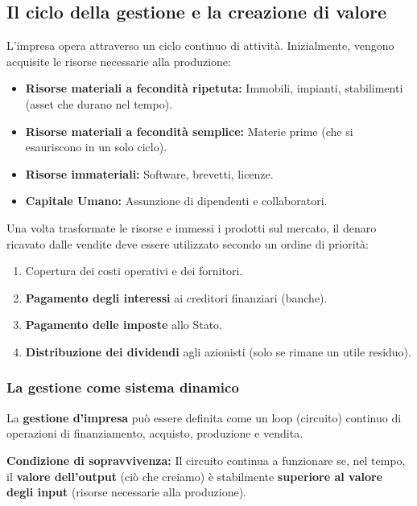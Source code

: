 \documentclass[a4paper,12pt]{article}
\begin{document}
	\subsection{Il ciclo della gestione e la creazione di valore}
	L'impresa opera attraverso un ciclo continuo di attività. Inizialmente, vengono acquisite le risorse necessarie alla produzione:
	\begin{itemize}
		\item \textbf{Risorse materiali a fecondità ripetuta:} Immobili, impianti, stabilimenti (asset che durano nel tempo).
		\item \textbf{Risorse materiali a fecondità semplice:} Materie prime (che si esauriscono in un solo ciclo).
		\item \textbf{Risorse immateriali:} Software, brevetti, licenze.
		\item \textbf{Capitale Umano:} Assunzione di dipendenti e collaboratori.
	\end{itemize}
	
	Una volta trasformate le risorse e immessi i prodotti sul mercato, il denaro ricavato dalle vendite deve essere utilizzato secondo un ordine di priorità:
	\begin{enumerate}
		\item Copertura dei costi operativi e dei fornitori.
		\item \textbf{Pagamento degli interessi} ai creditori finanziari (banche).
		\item \textbf{Pagamento delle imposte} allo Stato.
		\item \textbf{Distribuzione dei dividendi} agli azionisti (solo se rimane un utile residuo).
	\end{enumerate}
	
	\subsubsection{La gestione come sistema dinamico}
	La \textbf{gestione d'impresa} può essere definita come un loop (circuito) continuo di operazioni di finanziamento, acquisto, produzione e vendita. 
	
	\begin{tcolorbox}[colback=green!5,colframe=green!60!black]
		\textbf{Condizione di sopravvivenza:} Il circuito continua a funzionare se, nel tempo, il \textbf{valore dell'output} (ciò che creiamo) è stabilmente \textbf{superiore al valore degli input} (risorse necessarie alla produzione). 
	\end{tcolorbox}
	
\end{document}
